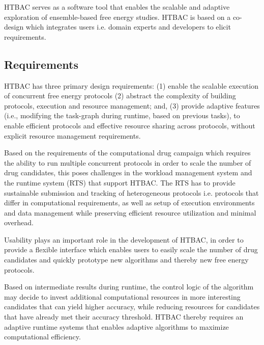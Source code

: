 HTBAC serves as a software tool that enables the scalable and adaptive exploration 
of ensemble-based free energy studies. HTBAC is based on a 
co-design which integrates users i.e. domain experts and developers to elicit
requirements. 




\subsection{Requirements}

HTBAC has three primary design requirements\@: (1) enable the scalable
execution of concurrent free energy protocols (2) abstract the complexity of 
building protocols, execution and resource management; and, (3) provide adaptive 
features (i.e., modifying the task-graph during runtime, based on previous tasks), 
to enable efficient protocols and effective resource sharing across protocols, 
without explicit resource management requirements.

Based on the requirements of the computational drug campaign which requires the 
ability to run multiple concurrent protocols in order to scale the number of 
drug candidates, this poses challenges in the 
workload management system and the runtime system (RTS) that support HTBAC. The 
RTS has to provide sustainable submission and tracking of heterogeneous protocols 
i.e. protocols that differ in computational requirements, as well as 
setup of execution environments and data management while preserving 
efficient resource utilization and minimal overhead. 

Usability plays an important role in the development of HTBAC, in order to provide
a flexible interface which enables users to easily scale the number of drug 
candidates and quickly prototype new algorithms and thereby new free energy 
protocols. 

Based on intermediate results during runtime, the control logic of the algorithm 
may decide to invest additional computational resources in more interesting  
candidates that can yield higher accuracy, while reducing resources for candidates
that have already met their accuracy threshold. HTBAC thereby requires an 
adaptive runtime systems that enables adaptive algorithms to maximize 
computational efficiency. 


